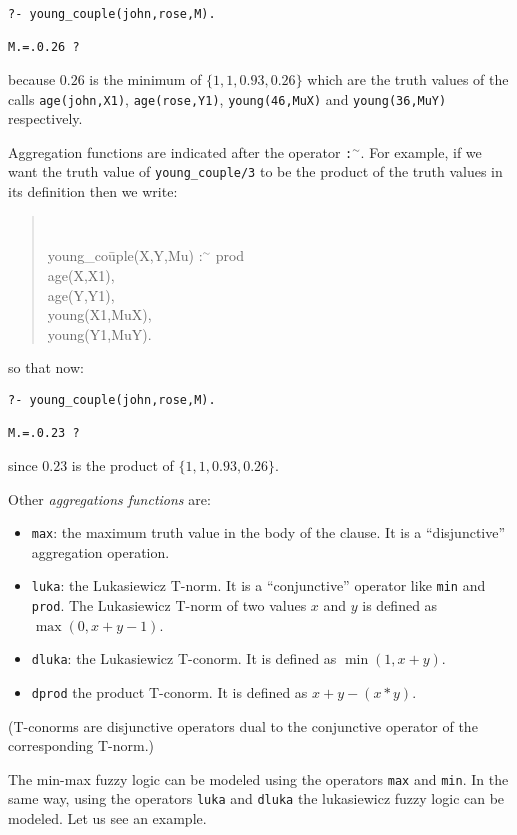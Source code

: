 \begin{verbatim}
?- young_couple(john,rose,M).

M.=.0.26 ? 
\end{verbatim}
%
because $0.26$ is the minimum of $\{1,1,0.93,0.26\}$ which are the
truth values of the calls \texttt{age(john,X1)},
\texttt{age(rose,Y1)}, \texttt{young(46,MuX)} and
\texttt{young(36,MuY)} respectively.

Aggregation functions are indicated after the operator
\texttt{:{\tiny$^\sim$}}. For example, if we want the truth value of
\texttt{young\_couple/3} to be the product of the truth values in its
definition then we write: 
\begin{quote}
{\tt
\begin{tabbing} 
young\_co\=uple(X,Y,Mu) :{\tiny$^\sim$} prod \\
\>        age(X,X1), \\
\>        age(Y,Y1),  \\
\>        young(X1,MuX), \\
\>        young(Y1,MuY).
\end{tabbing}
}
\end{quote}
%
so that now:

\begin{verbatim}
?- young_couple(john,rose,M).

M.=.0.23 ? 
\end{verbatim}
%
since $0.23$ is the product of $\{1,1,0.93,0.26\}$. 

Other {\em aggregations functions} are:
\begin{itemize}
\item \texttt{max}: the maximum truth value in the body of the
  clause. It is a ``disjunctive'' aggregation operation.
\item \texttt{luka}: the Lukasiewicz T-norm. It is a ``conjunctive''
  operator like \texttt{min} and \texttt{prod}. The Lukasiewicz T-norm
  of two values $x$ and $y$ is defined as $\max(0,x + y -1)$.
\item \texttt{dluka}: the Lukasiewicz T-conorm. It is defined as
  $\min(1,x + y)$. 
\item \texttt{dprod} the product T-conorm. It is defined as $x + y -
  (x * y)$.
\end{itemize}
%
(T-conorms are disjunctive operators dual to the conjunctive operator
of the corresponding T-norm.)

The min-max fuzzy logic can be modeled using the operators \texttt{max} and
\texttt{min}. In the same way, using the operators \texttt{luka} and
\texttt{dluka} the lukasiewicz fuzzy logic can be modeled. Let us see
an example. 

